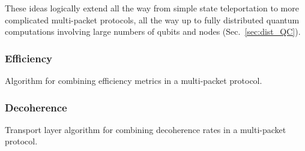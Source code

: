 \documentclass[aps, rmp, twocolumn, amsmath, amssymb, nofootinbib, superscriptaddress, longbibliography, floatfix, table-of-contents, eqsecnum]{revtex4-1}
\newcommand{\comment}[1]{{\color{blue}{\textbf{#1}}}}
\begin{document}
These ideas logically extend all the way from simple state teleportation to more complicated multi-packet protocols, all the way up to fully distributed quantum computations involving large numbers of qubits and nodes (Sec.~\ref{sec:dist_QC}).

\comment{To do}

%
%

\subsubsection{Efficiency} 

\begin{table}[!htb]
\caption{Algorithm for combining efficiency metrics in a multi-packet protocol.} \label{alg:combine_eff}
\end{table}

\comment{To do}

%
%

\subsubsection{Decoherence} 

\begin{table}[!htb]
\caption{Transport layer algorithm for combining decoherence rates in a multi-packet protocol.} \label{alg:combine_lat}
\end{table}

\comment{To do}

%
%
\end{document}
